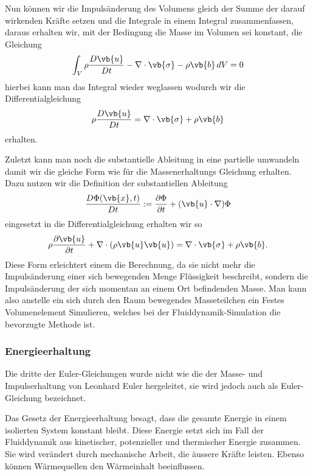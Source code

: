 Nun können wir die Impulsänderung des Volumens gleich der Summe der darauf wirkenden Kräfte setzen und die Integrale in einem Integral zusammenfassen, daraus erhalten wir, mit der Bedingung die Masse im Volumen sei konstant, die Gleichung 
\[\int_{V} \rho \frac{D\vb{u}}{Dt} - \nabla \cdot \vb{\sigma} -\rho \vb{b}\, dV
=
0
\]
hierbei kann man das Integral wieder weglassen wodurch wir die Differentialgleichung
\begin{equation}
\label{openfoam:euler2_1}
\rho \frac{D\vb{u}}{Dt}
= 
\nabla \cdot \vb{\sigma} +\rho \vb{b}
\end{equation}
erhalten.

Zuletzt kann man noch die substantielle Ableitung in eine partielle umwandeln damit wir die gleiche Form wie für die Massenerhaltungs Gleichung erhalten.
Dazu nutzen wir die Definition der substantiellen Ableitung
\[
\frac{D\Phi(\vb{x},t)}{Dt}
:=
\frac{\partial \Phi}{\partial t}+(\vb{u}\cdot \nabla)\Phi
\] 
eingesetzt in die Differentialgleichung erhalten wir so 
\begin{equation}
\label{openfoam:euler2}
\rho\frac{\partial\vb{u}}{\partial t} + \nabla \cdot(\rho\vb{u}\vb{u})
= 
\nabla \cdot \vb{\sigma} +\rho \vb{b}.
\end{equation}
Diese Form erleichtert einem die Berechnung, da sie nicht mehr die Impulsänderung einer sich bewegenden Menge Flüssigkeit beschreibt, sondern die Impulsänderung der sich momentan an einem Ort befindenden Masse. Man kann also anstelle ein sich durch den Raum bewegendes Masseteilchen ein Festes Volumenelement Simulieren, welches bei der Fluiddynamik-Simulation die bevorzugte Methode ist.

\subsubsection{Energieerhaltung}
Die dritte der Euler-Gleichungen wurde nicht wie die der Masse- und Impulserhaltung von Leonhard Euler hergeleitet, sie wird jedoch auch als Euler-Gleichung bezeichnet.

Das Gesetz der Energieerhaltung besagt, dass die gesamte Energie in einem isolierten System konstant bleibt.
Diese Energie setzt sich im Fall der Fluiddynamik aus kinetischer, potenzieller und thermischer Energie zusammen.
Sie wird verändert durch mechanische Arbeit, die äussere Kräfte leisten. Ebenso können Wärmequellen den Wärmeinhalt beeinflussen.

